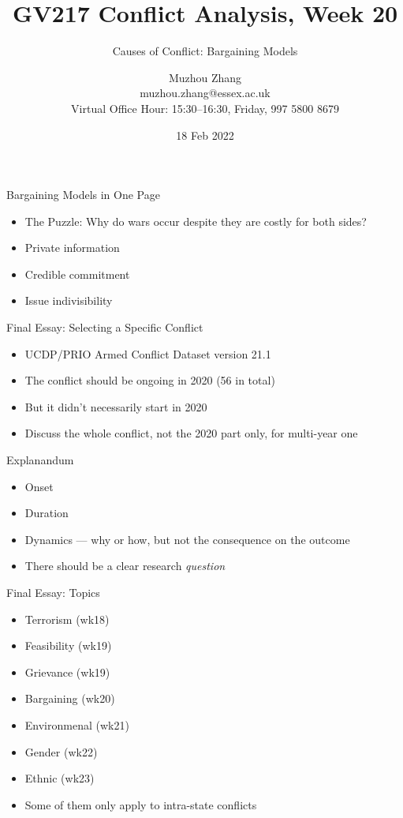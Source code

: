 \documentclass[handout]{beamer}
\title{GV217 Conflict Analysis, Week 20}
\subtitle{Causes of Conflict: Bargaining Models}
\author{Muzhou Zhang\\ muzhou.zhang@essex.ac.uk\\ Virtual Office Hour: 15:30--16:30, Friday, 997 5800 8679}
\date{18 Feb 2022}
\begin{document}
\maketitle
{}

\begin{frame}{Bargaining Models in One Page}
    \begin{itemize}
        \pause\item The Puzzle: Why do wars occur despite they are costly for both sides?
        \pause\item Private information
        \pause\item Credible commitment
        \pause\item Issue indivisibility
    \end{itemize}
\end{frame}

\begin{frame}{Final Essay: Selecting a Specific Conflict}
    \begin{itemize}
        \pause\item UCDP/PRIO Armed Conflict Dataset version 21.1
        \pause\item The conflict should be ongoing in 2020 (56 in total)
        \pause\item But it didn't necessarily start in 2020
        \pause\item Discuss the whole conflict, not the 2020 part only, for multi-year one
    \end{itemize}
\end{frame}

\begin{frame}{Explanandum}
    \begin{itemize}
        \pause\item Onset
        \pause\item Duration
        \pause\item Dynamics --- why or how, but not the consequence on the outcome
        \pause\item There should be a clear research \emph{question}
    \end{itemize}
\end{frame}

\begin{frame}{Final Essay: Topics}
    \begin{itemize}
        \pause\item Terrorism (wk18)
        \pause\item Feasibility (wk19)
        \pause\item Grievance (wk19)
        \pause\item Bargaining (wk20)
        \pause\item Environmenal (wk21)
        \pause\item Gender (wk22)
        \pause\item Ethnic (wk23)
        \pause\item Some of them only apply to intra-state conflicts
    \end{itemize}
\end{frame}
\end{document}
